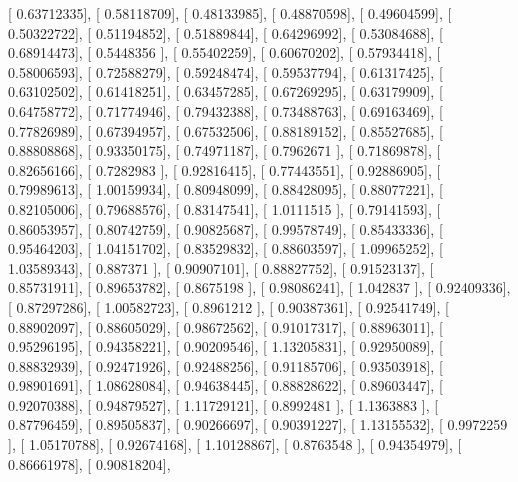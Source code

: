 \documentclass{article}
\begin{document}
       [ 0.63712335],
       [ 0.58118709],
       [ 0.48133985],
       [ 0.48870598],
       [ 0.49604599],
       [ 0.50322722],
       [ 0.51194852],
       [ 0.51889844],
       [ 0.64296992],
       [ 0.53084688],
       [ 0.68914473],
       [ 0.5448356 ],
       [ 0.55402259],
       [ 0.60670202],
       [ 0.57934418],
       [ 0.58006593],
       [ 0.72588279],
       [ 0.59248474],
       [ 0.59537794],
       [ 0.61317425],
       [ 0.63102502],
       [ 0.61418251],
       [ 0.63457285],
       [ 0.67269295],
       [ 0.63179909],
       [ 0.64758772],
       [ 0.71774946],
       [ 0.79432388],
       [ 0.73488763],
       [ 0.69163469],
       [ 0.77826989],
       [ 0.67394957],
       [ 0.67532506],
       [ 0.88189152],
       [ 0.85527685],
       [ 0.88808868],
       [ 0.93350175],
       [ 0.74971187],
       [ 0.7962671 ],
       [ 0.71869878],
       [ 0.82656166],
       [ 0.7282983 ],
       [ 0.92816415],
       [ 0.77443551],
       [ 0.92886905],
       [ 0.79989613],
       [ 1.00159934],
       [ 0.80948099],
       [ 0.88428095],
       [ 0.88077221],
       [ 0.82105006],
       [ 0.79688576],
       [ 0.83147541],
       [ 1.0111515 ],
       [ 0.79141593],
       [ 0.86053957],
       [ 0.80742759],
       [ 0.90825687],
       [ 0.99578749],
       [ 0.85433336],
       [ 0.95464203],
       [ 1.04151702],
       [ 0.83529832],
       [ 0.88603597],
       [ 1.09965252],
       [ 1.03589343],
       [ 0.887371  ],
       [ 0.90907101],
       [ 0.88827752],
       [ 0.91523137],
       [ 0.85731911],
       [ 0.89653782],
       [ 0.8675198 ],
       [ 0.98086241],
       [ 1.042837  ],
       [ 0.92409336],
       [ 0.87297286],
       [ 1.00582723],
       [ 0.8961212 ],
       [ 0.90387361],
       [ 0.92541749],
       [ 0.88902097],
       [ 0.88605029],
       [ 0.98672562],
       [ 0.91017317],
       [ 0.88963011],
       [ 0.95296195],
       [ 0.94358221],
       [ 0.90209546],
       [ 1.13205831],
       [ 0.92950089],
       [ 0.88832939],
       [ 0.92471926],
       [ 0.92488256],
       [ 0.91185706],
       [ 0.93503918],
       [ 0.98901691],
       [ 1.08628084],
       [ 0.94638445],
       [ 0.88828622],
       [ 0.89603447],
       [ 0.92070388],
       [ 0.94879527],
       [ 1.11729121],
       [ 0.8992481 ],
       [ 1.1363883 ],
       [ 0.87796459],
       [ 0.89505837],
       [ 0.90266697],
       [ 0.90391227],
       [ 1.13155532],
       [ 0.9972259 ],
       [ 1.05170788],
       [ 0.92674168],
       [ 1.10128867],
       [ 0.8763548 ],
       [ 0.94354979],
       [ 0.86661978],
       [ 0.90818204],
\end{document}
